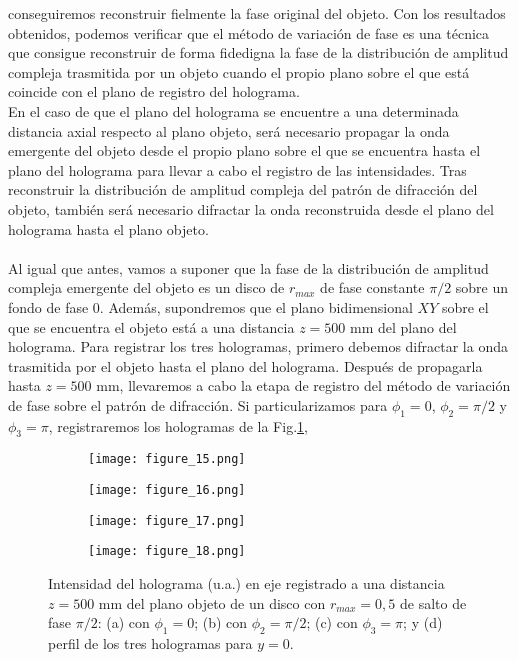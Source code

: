\documentclass[12pt]{article}
\begin{document}
conseguiremos reconstruir fielmente la fase original del objeto. Con los resultados obtenidos, podemos verificar que el método de variación de fase es una técnica que consigue reconstruir de forma fidedigna la fase de la distribución de amplitud compleja trasmitida por un objeto cuando el propio plano sobre el que está coincide con el plano de registro del holograma. \\
En el caso de que el plano del holograma se encuentre a una determinada distancia axial  respecto al plano objeto, será necesario propagar la onda emergente del objeto desde el propio plano sobre el que se encuentra hasta el plano del holograma para llevar a cabo el registro de las intensidades. Tras reconstruir la distribución de amplitud compleja del patrón de difracción del objeto, también será necesario   difractar la onda reconstruida desde el plano del holograma hasta el plano objeto. \\ \\
Al igual que antes, vamos a suponer que la fase de la distribución de amplitud compleja emergente del objeto es  un disco de  $r_{max}$ de fase constante $\pi /2$ sobre un fondo de fase $0$. Además, supondremos que el plano bidimensional $XY$ sobre el que se encuentra el objeto está a una distancia $z = 500$ mm del plano del holograma.  Para registrar los tres hologramas, primero debemos difractar  la onda trasmitida por el objeto  hasta el plano del holograma.  Después de propagarla hasta  $z = 500$ mm, llevaremos a cabo la etapa de registro del método de variación de fase sobre el patrón de difracción. Si particularizamos para  $\phi_{1} = 0$, $\phi_{2}  = \pi/2$ y $\phi_{3}  = \pi$, registraremos  los hologramas de  la Fig.\ref{f10a},
\begin{figure}[b!]
\centering
    \begin{subfigure}[b]{0.45\textwidth}
        \texttt{[image: figure\_15.png]}
        \caption{}
        \label{f10a}
    \end{subfigure}
    \begin{subfigure}[b]{0.45\textwidth}
        \texttt{[image: figure\_16.png]}
        \caption{}
        \label{f10b}
        \end{subfigure}
    \begin{subfigure}[b]{0.45\textwidth}
        \texttt{[image: figure\_17.png]}
        \caption{}
        \label{f10c}
    \end{subfigure}
    \begin{subfigure}[b]{0.45\textwidth}
        \texttt{[image: figure\_18.png]}
        \caption{}
        \label{f10d}
  \end{subfigure}
  \caption{Intensidad del holograma (u.a.) en eje registrado a una distancia $z = 500$ mm del plano objeto de un disco con $r_{max} = 0,5$ de salto de fase $\pi/2$: (a) con $\phi_1 = 0$; (b) con $\phi_2 = \pi/2$; (c) con $\phi_3 = \pi$; y (d) perfil de los tres hologramas para $y = 0$.}
  \label{figura10}
\end{figure}
\end{document}
